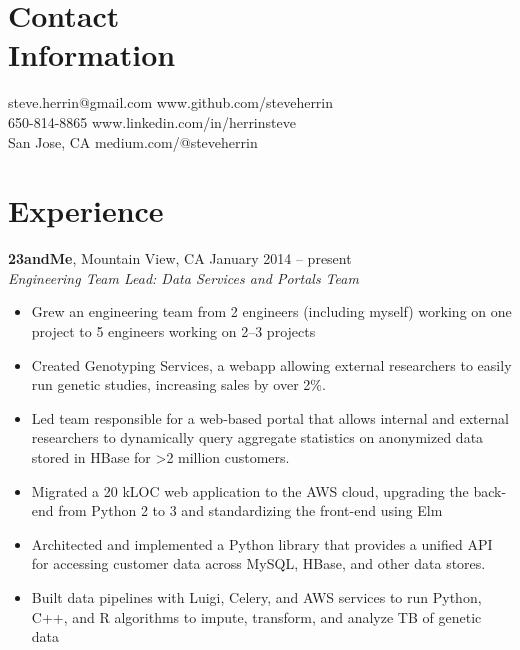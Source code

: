 \documentclass[margin,line]{resume}
\begin{document}
\begin{resume}

    \section{\mysidestyle Contact\\Information}

    steve.herrin@gmail.com		\hfill www.github.com/steveherrin		\vspace{0mm}\\\vspace{0mm}%
    650-814-8865				\hfill www.linkedin.com/in/herrinsteve		\vspace{0mm}\\\vspace{-4.5mm}%
    San Jose, CA    				\hfill medium.com/@steveherrin		\vspace{0mm}\\\vspace{0mm}%
    
    \section{\mysidestyle Experience}

    \textbf{23andMe}, Mountain View, CA \hfill January 2014 -- present\vspace{1mm}\\\vspace{1mm}%
    \textsl{Engineering Team Lead: Data Services and Portals Team}
    \begin{itemize}
    \item Grew an engineering team from 2 engineers (including myself) working on one project to 5 engineers working on 2--3 projects
    \item Created Genotyping Services, a webapp allowing external researchers to easily run genetic studies, increasing sales by over 2\%.
    \item Led team responsible for a web-based portal that allows internal and external researchers to dynamically query aggregate statistics on anonymized data stored in HBase for \textgreater 2 million customers.
    \item Migrated a 20 kLOC web application to the AWS cloud, upgrading the back-end from Python 2 to 3 and standardizing the front-end using Elm
    \item Architected and implemented a Python library that provides a unified API for accessing customer data across MySQL, HBase, and other data stores.
    \item Built data pipelines with Luigi, Celery, and AWS services to run Python, C++, and R algorithms to impute, transform, and analyze TB of genetic data
    \end{itemize}
    

\end{resume}
\end{document}
